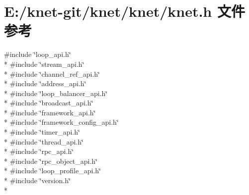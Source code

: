 \hypertarget{a00064}{}\section{E\+:/knet-\/git/knet/knet/knet.h 文件参考}
\label{a00064}
{\ttfamily \#include \char`\"{}loop\+\_\+api.\+h\char`\"{}}\\*
{\ttfamily \#include \char`\"{}stream\+\_\+api.\+h\char`\"{}}\\*
{\ttfamily \#include \char`\"{}channel\+\_\+ref\+\_\+api.\+h\char`\"{}}\\*
{\ttfamily \#include \char`\"{}address\+\_\+api.\+h\char`\"{}}\\*
{\ttfamily \#include \char`\"{}loop\+\_\+balancer\+\_\+api.\+h\char`\"{}}\\*
{\ttfamily \#include \char`\"{}broadcast\+\_\+api.\+h\char`\"{}}\\*
{\ttfamily \#include \char`\"{}framework\+\_\+api.\+h\char`\"{}}\\*
{\ttfamily \#include \char`\"{}framework\+\_\+config\+\_\+api.\+h\char`\"{}}\\*
{\ttfamily \#include \char`\"{}timer\+\_\+api.\+h\char`\"{}}\\*
{\ttfamily \#include \char`\"{}thread\+\_\+api.\+h\char`\"{}}\\*
{\ttfamily \#include \char`\"{}rpc\+\_\+api.\+h\char`\"{}}\\*
{\ttfamily \#include \char`\"{}rpc\+\_\+object\+\_\+api.\+h\char`\"{}}\\*
{\ttfamily \#include \char`\"{}loop\+\_\+profile\+\_\+api.\+h\char`\"{}}\\*
{\ttfamily \#include \char`\"{}version.\+h\char`\"{}}\\*
